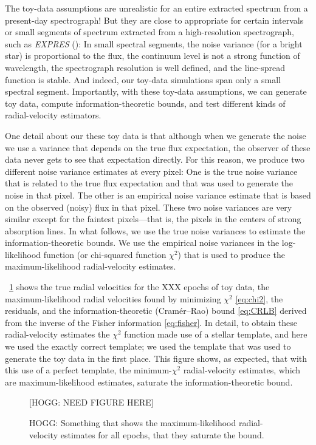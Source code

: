 \documentclass[modern]{aastex631}
\newcommand{\project}[1]{\textsl{#1}}
\newcommand{\figref}[1]{\figurename~\ref{#1}}
\begin{document}
The toy-data assumptions are unrealistic for an entire extracted spectrum from a present-day spectrograph!
But they are close to appropriate for certain intervals or small segments of spectrum extracted from a high-resolution spectrograph, such as \project{EXPRES} (\citealt{express}):
In small spectral segments, the noise variance (for a bright star) is proportional to the flux, the continuum level is not a strong function of wavelength, the spectrograph resolution is well defined, and the line-spread function is stable.
And indeed, our toy-data simulations span only a small spectral segment.
Importantly, with these toy-data assumptions, we can generate toy data, compute information-theoretic bounds, and test different kinds of radial-velocity estimators.

One detail about our these toy data is that although when we generate the noise we use a variance that depends on the true flux expectation, the observer of these data never gets to see that expectation directly.
For this reason, we produce two different noise variance estimates at every pixel:
One is the true noise variance that is related to the true flux expectation and that was used to generate the noise in that pixel.
The other is an empirical noise variance estimate that is based on the observed (noisy) flux in that pixel.
These two noise variances are very similar except for the faintest pixels---that is, the pixels in the centers of strong absorption lines.
In what follows, we use the true noise variances to estimate the information-theoretic bounds.
We use the empirical noise variances in the log-likelihood function (or chi-squared function $\chi^2$) that is used to produce the maximum-likelihood radial-velocity estimates.

\figref{fig:mlrvs} shows the true radial velocities for the XXX epochs of toy data, the maximum-likelihood radial velocities found by minimizing $\chi^2$ \eqref{eq:chi2}, the residuals, and the information-theoretic (Cram\'er--Rao) bound \eqref{eq:CRLB} derived from the inverse of the Fisher information \eqref{eq:fisher}.
In detail, to obtain these radial-velocity estimates the $\chi^2$ function made use of a stellar template, and here we used the exactly correct template; we used the template that was used to generate the toy data in the first place.
This figure shows, as expected, that with this use of a perfect template, the minimum-$\chi^2$ radial-velocity estimates, which are maximum-likelihood estimates, saturate the information-theoretic bound.

\begin{figure}[t]
  \begin{mdframed}
    \begin{center}
    [HOGG: NEED FIGURE HERE]
    \end{center}
    \caption{HOGG: Something that shows the maximum-likelihood radial-velocity estimates for all epochs, that they saturate the bound.\label{fig:mlrvs}}
  \end{mdframed}
\end{figure}
\end{document}
